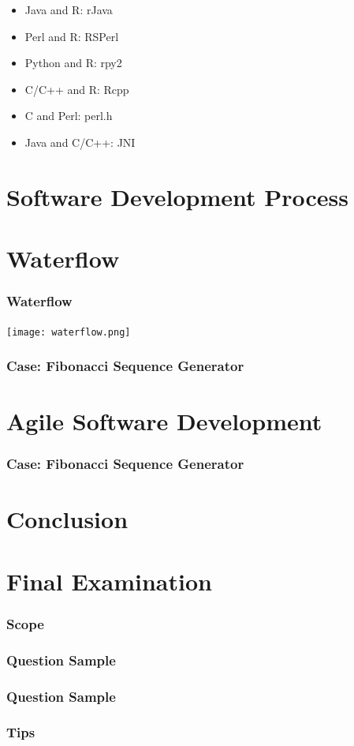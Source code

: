 \documentclass[UTF8]{beamer}
\begin{document}
\begin{frame}
  \begin{itemize}
    \item Java and R: rJava
    \item Perl and R: RSPerl
    \item Python and R: rpy2
    \item C/C++ and R: Rcpp
    \item C and Perl: perl.h
    \item Java and C/C++: JNI
  \end{itemize}
\end{frame}


\section{Software Development Process}

\section{Waterflow}
\begin{frame}
  \frametitle{Waterflow}
  \centerline{\texttt{[image: waterflow.png]}}
\end{frame}

\begin{frame}
  \frametitle{Case: Fibonacci Sequence Generator}
\end{frame}

\section{Agile Software Development}

\begin{frame}
  \frametitle{Case: Fibonacci Sequence Generator}
\end{frame}

\section{Conclusion}

\section{Final Examination}
\begin{frame}
  \frametitle{Scope}
\end{frame}

\begin{frame}
  \frametitle{Question Sample}
\end{frame}

\begin{frame}
  \frametitle{Question Sample}
\end{frame}

\begin{frame}
  \frametitle{Tips}
\end{frame}
\end{document}
